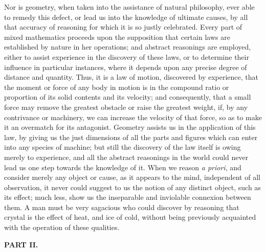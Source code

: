 \documentclass[]{article}
\newcommand*{\itemsubsection}[1]{\begin{center}\addcontentsline{toc}{subsection}{#1}\textbf{#1}\end{center}}
\begin{document}
\begin{sectionbody}
\humeparagraph  Nor is geometry, when taken into the assistance of natural philosophy, ever able to remedy this defect, or lead us into the knowledge of ultimate causes, by all that accuracy of reasoning for which it is so justly celebrated. Every part of mixed mathematics proceeds upon the supposition that certain laws are established by nature in her operations; and abstract reasonings are employed, either to assist experience in the discovery of these laws, or to determine their influence in particular instances, where it depends upon any precise degree of distance and quantity. Thus, it is a law of motion, discovered by experience, that the moment or force of any body in motion is in the compound ratio or proportion of its solid contents and its velocity; and consequently, that a small force may remove the greatest obstacle or raise the greatest weight, if, by any contrivance or machinery, we can increase the velocity of that force, so as to make it an overmatch for its antagonist. Geometry assists us in the application of this law, by giving us the just dimensions of all the parts and figures which can enter into any species of machine; but still the discovery of the law itself is owing merely to experience, and all the abstract reasonings in the world could never lead us one step towards the knowledge of it. When we reason \emph{a priori}, and consider merely any object or cause, as it appears to the mind, independent of all observation, it never could suggest to us the notion of any distinct object, such as its effect; much less, show us the inseparable and inviolable connexion between them. A man must be very sagacious who could discover by reasoning that crystal is the effect of heat, and ice of cold, without being previously acquainted with the operation of these qualities.


\end{sectionbody}

\itemsubsection{PART II.}
\end{document}
